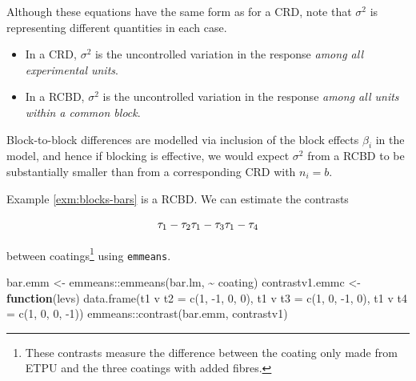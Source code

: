 \documentclass[
]{book}
\newenvironment{Shaded}{\begin{snugshade}}{\end{snugshade}}
\newcommand{\ControlFlowTok}[1]{\textcolor[rgb]{0.13,0.29,0.53}{\textbf{#1}}}
\newcommand{\DecValTok}[1]{\textcolor[rgb]{0.00,0.00,0.81}{#1}}
\newcommand{\FunctionTok}[1]{\textcolor[rgb]{0.00,0.00,0.00}{#1}}
\newcommand{\NormalTok}[1]{#1}
\newcommand{\OtherTok}[1]{\textcolor[rgb]{0.56,0.35,0.01}{#1}}
\newcommand{\SpecialCharTok}[1]{\textcolor[rgb]{0.00,0.00,0.00}{#1}}
\newcommand{\StringTok}[1]{\textcolor[rgb]{0.31,0.60,0.02}{#1}}
\theoremstyle{definition}
\theoremstyle{definition}
\theoremstyle{definition}
\theoremstyle{definition}
\theoremstyle{remark}
\begin{document}
Although these equations have the same form as for a CRD, note that \(\sigma^2\) is representing different quantities in each case.

\begin{itemize}
\item
  In a CRD, \(\sigma^2\) is the uncontrolled variation in the response \emph{among all experimental units}.
\item
  In a RCBD, \(\sigma^2\) is the uncontrolled variation in the response \emph{among all units within a common block}.
\end{itemize}

Block-to-block differences are modelled via inclusion of the block effects \(\beta_i\) in the model, and hence if blocking is effective, we would expect \(\sigma^2\) from a RCBD to be substantially smaller than from a corresponding CRD with \(n_i = b\).

Example \ref{exm:blocks-bars} is a RCBD. We can estimate the contrasts

\[
\tau_{1} - \tau_{2} \\
\tau_{1} - \tau_{3} \\
\tau_{1} - \tau_{4} \\
\]

between coatings\footnote{These contrasts measure the difference between the coating only made from ETPU and the three coatings with added fibres.} using \texttt{emmeans}.

\begin{Shaded}
\begin{Highlighting}[]
\NormalTok{bar.emm }\OtherTok{\textless{}{-}}\NormalTok{ emmeans}\SpecialCharTok{::}\FunctionTok{emmeans}\NormalTok{(bar.lm, }\SpecialCharTok{\textasciitilde{}}\NormalTok{ coating)}
\NormalTok{contrastv1.emmc }\OtherTok{\textless{}{-}} \ControlFlowTok{function}\NormalTok{(levs)}
  \FunctionTok{data.frame}\NormalTok{(}\StringTok{\textquotesingle{}t1 v t2\textquotesingle{}} \OtherTok{=} \FunctionTok{c}\NormalTok{(}\DecValTok{1}\NormalTok{, }\SpecialCharTok{{-}}\DecValTok{1}\NormalTok{, }\DecValTok{0}\NormalTok{, }\DecValTok{0}\NormalTok{), }\StringTok{\textquotesingle{}t1 v t3\textquotesingle{}} \OtherTok{=} \FunctionTok{c}\NormalTok{(}\DecValTok{1}\NormalTok{, }\DecValTok{0}\NormalTok{, }\SpecialCharTok{{-}}\DecValTok{1}\NormalTok{, }\DecValTok{0}\NormalTok{), }
  \StringTok{\textquotesingle{}t1 v t4\textquotesingle{}} \OtherTok{=} \FunctionTok{c}\NormalTok{(}\DecValTok{1}\NormalTok{, }\DecValTok{0}\NormalTok{, }\DecValTok{0}\NormalTok{, }\SpecialCharTok{{-}}\DecValTok{1}\NormalTok{))}
\NormalTok{emmeans}\SpecialCharTok{::}\FunctionTok{contrast}\NormalTok{(bar.emm, }\StringTok{\textquotesingle{}contrastv1\textquotesingle{}}\NormalTok{)}
\end{Highlighting}
\end{Shaded}
\end{document}
